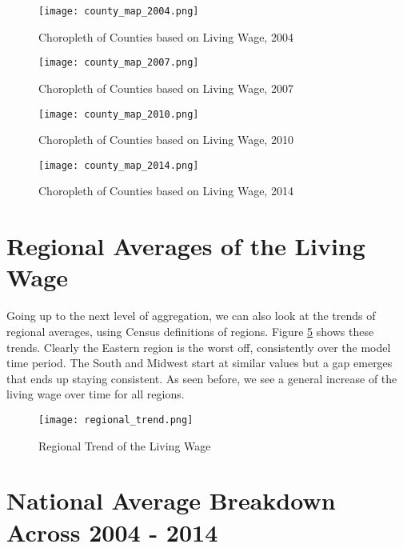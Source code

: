 \begin{figure}[H]
    \centering
        \texttt{[image: county\_map\_2004.png]}
        \caption{Choropleth of Counties based on Living Wage, 2004}
    \label{f:ch4_county_map_2004}
\end{figure}

\begin{figure}[H]
    \centering
        \texttt{[image: county\_map\_2007.png]}
        \caption{Choropleth of Counties based on Living Wage, 2007}
    \label{f:ch4_county_map_2006}
\end{figure}

\begin{figure}[H]
    \centering
        \texttt{[image: county\_map\_2010.png]}
        \caption{Choropleth of Counties based on Living Wage, 2010}
    \label{f:ch4_county_map_2014}
\end{figure}

\begin{figure}[H]
    \centering
        \texttt{[image: county\_map\_2014.png]}
        \caption{Choropleth of Counties based on Living Wage, 2014}
    \label{f:ch4_county_map_2014}
\end{figure}




\section{Regional Averages of the Living Wage}

Going up to the next level of aggregation, we can also look at the trends of regional averages, using Census definitions of regions. Figure \ref{f:ch4_regional_trend} shows these trends. Clearly the Eastern region is the worst off, consistently over the model time period. The South and Midwest start at similar values but a gap emerges that ends up staying consistent. As seen before, we see a general increase of the living wage over time for all regions.

\begin{figure}[H]
    \centering
        \texttt{[image: regional\_trend.png]}
        \caption{Regional Trend of the Living Wage}
    \label{f:ch4_regional_trend}
\end{figure}




\section{National Average Breakdown Across 2004 - 2014}

